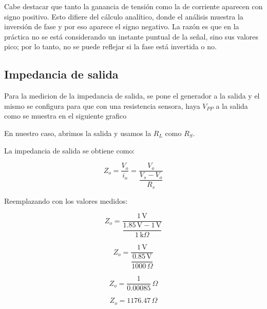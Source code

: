       Cabe destacar que tanto la ganancia de tensión como la de corriente aparecen con signo positivo. Esto difiere del 
      cálculo analítico, donde el análisis muestra la inversión de fase y por eso aparece el signo negativo. La razón 
      es que en la práctica no se está considerando un instante puntual de la señal, sino sus valores pico; por lo 
      tanto, no se puede reflejar si la fase está invertida o no.

    \subsection{Impedancia de salida}
    Para la medicion de la impedancia de salida, se pone el generador a la salida y el mismo se configura para que con
    una resistencia sensora, haya $V_{PP}$ a la salida como se muestra en el siguiente grafico


    \vspace{0.5cm}

    En nuestro caso, abrimos la salida y usamos la $R_L$ como $R_S$.

    La impedancia de salida se obtiene como:

    \[
    Z_o = \frac{V_o}{i_o} 
         = \frac{V_o}{\dfrac{V_s - V_o}{R_s}}
    \]
    
    Reemplazando con los valores medidos:
    
    \[
    Z_o = \frac{1\,\text{V}}{\dfrac{1.85\,\text{V} - 1\,\text{V}}{1\,\text{k}\Omega}}
    \]
    
    \[
    Z_o = \frac{1\,\text{V}}{\dfrac{0.85\,\text{V}}{1000\,\Omega}}
    \]
    
    \[
    Z_o = \frac{1}{0.00085}\,\Omega
    \]
    
    \[
    Z_o = \boxed{1176.47\,\Omega}
    \]

